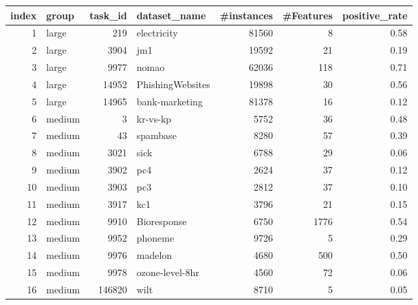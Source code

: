 \begin{tabular}{rlrlrrr}
\toprule
 index &  group &  task\_id &                     dataset\_name &  \#instances &  \#Features &  positive\_rate \\
\midrule
     1 &  large &      219 &                      electricity &       81560 &          8 &           0.58 \\
     2 &  large &     3904 &                              jm1 &       19592 &         21 &           0.19 \\
     3 &  large &     9977 &                            nomao &       62036 &        118 &           0.71 \\
     4 &  large &    14952 &                 PhishingWebsites &       19898 &         30 &           0.56 \\
     5 &  large &    14965 &                   bank-marketing &       81378 &         16 &           0.12 \\
     6 & medium &        3 &                         kr-vs-kp &        5752 &         36 &           0.48 \\
     7 & medium &       43 &                         spambase &        8280 &         57 &           0.39 \\
     8 & medium &     3021 &                             sick &        6788 &         29 &           0.06 \\
     9 & medium &     3902 &                              pc4 &        2624 &         37 &           0.12 \\
    10 & medium &     3903 &                              pc3 &        2812 &         37 &           0.10 \\
    11 & medium &     3917 &                              kc1 &        3796 &         21 &           0.15 \\
    12 & medium &     9910 &                      Bioresponse &        6750 &       1776 &           0.54 \\
    13 & medium &     9952 &                          phoneme &        9726 &          5 &           0.29 \\
    14 & medium &     9976 &                          madelon &        4680 &        500 &           0.50 \\
    15 & medium &     9978 &                  ozone-level-8hr &        4560 &         72 &           0.06 \\
    16 & medium &   146820 &                             wilt &        8710 &          5 &           0.05 \\

\end{tabular}
